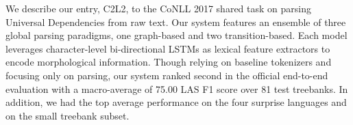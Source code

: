 We describe our entry, C2L2, to the CoNLL 2017 shared task on parsing Universal Dependencies from raw text. Our system features an ensemble of three global parsing paradigms, one graph-based and two transition-based. Each model leverages character-level bi-directional LSTMs as lexical feature extractors to encode morphological information. Though relying on baseline tokenizers and focusing only on parsing, our system ranked second in the official end-to-end evaluation with a macro-average of 75.00 LAS F1 score over 81 test treebanks. In addition, we had the top average performance on the four surprise languages and on the small treebank subset.
